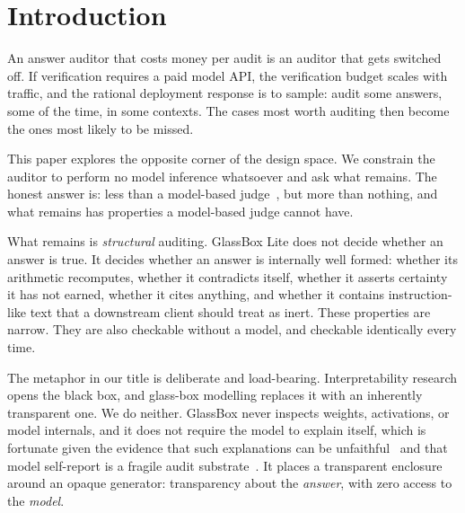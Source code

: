 \begin{abstract}
We then measure the probes themselves on a constructed benchmark of 187 items with labels
fixed by construction. Precision is 1.000 on every probe with zero false positives, but
recall splits the probes in two: those that \emph{compute} a property generalise to unseen
phrasing (arithmetic recomputation 1.000, contradiction 0.833) while those that \emph{match
a vocabulary} do not (0.000 to 0.333 on a held-out split). Repairing the vocabularies raised
development recall to 1.000 and moved held-out recall almost not at all. That is a bound on
the zero-inference design, not a defect list. GlassBox remains a structural auditor and
never a fact-checker: we measure whether probes fire correctly, not whether answers are
true.
\end{abstract}

\section{Introduction}

An answer auditor that costs money per audit is an auditor that gets switched off. If
verification requires a paid model API, the verification budget scales with traffic, and
the rational deployment response is to sample: audit some answers, some of the time, in
some contexts. The cases most worth auditing then become the ones most likely to be
missed.

This paper explores the opposite corner of the design space. We constrain the auditor to
perform no model inference whatsoever and ask what remains. The honest answer is: less
than a model-based judge~\cite{zheng2023judging}, but more than nothing, and what remains
has properties a model-based judge cannot have.

What remains is \emph{structural} auditing. GlassBox Lite does not decide whether an
answer is true. It decides whether an answer is internally well formed: whether its
arithmetic recomputes, whether it contradicts itself, whether it asserts certainty it has
not earned, whether it cites anything, and whether it contains instruction-like text that
a downstream client should treat as inert. These properties are narrow. They are also
checkable without a model, and checkable identically every time.

The metaphor in our title is deliberate and load-bearing. Interpretability research
opens the black box, and glass-box modelling replaces it with an inherently transparent
one. We do neither. GlassBox never inspects weights, activations, or model internals, and
it does not require the model to explain itself, which is fortunate given the evidence
that such explanations can be unfaithful~\cite{turpin2023unfaithful} and that model
self-report is a fragile audit substrate~\cite{kadavath2022know}. It places a transparent
enclosure around an opaque generator: transparency about the \emph{answer}, with zero
access to the \emph{model}.

